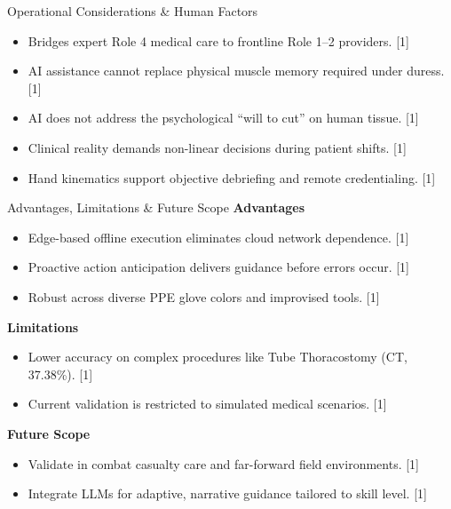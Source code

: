 \documentclass[aspectratio=169, 10pt]{beamer}
\begin{document}
\begin{frame}{Operational Considerations \& Human Factors}
    \vspace{0.3cm}
    \begin{itemize}
        \setlength{\itemsep}{8pt}
        \item Bridges expert Role 4 medical care to frontline Role 1--2 providers. [1]
        \item AI assistance cannot replace physical muscle memory required under duress. [1]
        \item AI does not address the psychological ``will to cut'' on human tissue. [1]
        \item Clinical reality demands non-linear decisions during patient shifts. [1]
        \item Hand kinematics support objective debriefing and remote credentialing. [1]
    \end{itemize}
\end{frame}

\begin{frame}{Advantages, Limitations \& Future Scope}
    \vspace{0.2cm}
    \textbf{Advantages}
    \begin{itemize}
        \setlength{\itemsep}{3pt}
        \item Edge-based offline execution eliminates cloud network dependence. [1]
        \item Proactive action anticipation delivers guidance before errors occur. [1]
        \item Robust across diverse PPE glove colors and improvised tools. [1]
    \end{itemize}

    \textbf{Limitations}
    \begin{itemize}
        \setlength{\itemsep}{3pt}
        \item Lower accuracy on complex procedures like Tube Thoracostomy (CT, 37.38\%). [1]
        \item Current validation is restricted to simulated medical scenarios. [1]
    \end{itemize}

    \textbf{Future Scope}
    \begin{itemize}
        \setlength{\itemsep}{3pt}
        \item Validate in combat casualty care and far-forward field environments. [1]
        \item Integrate LLMs for adaptive, narrative guidance tailored to skill level. [1]
    \end{itemize}
\end{frame}
\end{document}
